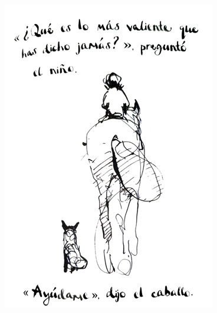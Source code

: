 \documentclass[spanish]{textolivre}
\begin{document}
\begin{figure}[htbp]
\begin{minipage}[t]{0.32\textwidth}
\includegraphics[width=\linewidth]{Fig2.png}
 \label{fig2}
\end{minipage}
\begin{minipage}[t]{0.32\textwidth}

\end{minipage}
\end{figure}
\end{document}
